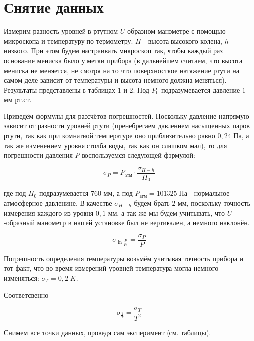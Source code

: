 \documentclass[a4paper, 12pt]{article} %
\begin{document}
\section{Снятие данных}

Измерим разность уровней в ртутном $U$-образном манометре с помощью микроскопа и температуру по термометру. $H$ - высота высокого колена, $h$ - низкого. При этом будем настраивать микроскоп так, чтобы каждый раз основание мениска было у метки прибора (в дальнейшем считаем, что высота мениска не меняется, не смотря на то что поверхностное натяжение ртути на самом деле зависит от температуры и высота немного должна меняться). Результаты представлены в таблицах $1$ и $2$. Под $P_0$ подразумевается давление $1$ мм рт.ст.

Приведём формулы для рассчётов погрешностей.
Поскольку давление напрямую зависит от разности уровней ртути (пренебрегаем давлением насыщенных паров ртути, так как при комнатной температуре оно приблизительно равно $0,24$ Па, а так же изменением уровня столба воды, так как он слишком мал), то для погрешности давления $P$ воспользуемся следующей формулой: 

\begin{equation}
    \sigma_P = P_{\text{aтм}} \cdot \frac{\sigma_{H-h}}{H_0}
\end{equation}

где под $H_0$ подразумевается $760$ мм, а под $P_{\text{атм}} = 101325 \; \text{Па}$ - нормальное атмосферное давленине. В качестве $\sigma_{H-h}$ будем брать $2$ мм, поскольку точность измерения каждого из уровня $0,1$ мм, а так же мы будем учитывать, что $U$-образный манометр в нашей установке был не вертикален, а немного наклонён.

\begin{equation}
    \sigma_{\ln{\frac{P}{P_0}}} = \frac{\sigma_P}{P}
\end{equation}

Погрешность определения температуры возьмём учитывая точность прибора и тот факт, что во время измерений уровней температура могла немного изменяться: $\sigma_{T} = 0,2 \; K$.

Соответсвенно

\begin{equation}
    \sigma_{\frac{1}{T}} = \frac{\sigma_T}{T^2}
\end{equation}

Снимем все точки данных, проведя сам эксперимент (см. таблицы).
\end{document}
